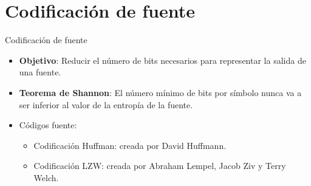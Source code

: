 \documentclass[10pt,compress]{beamer} %
\begin{document}


\section{Codificación de fuente}
\begin{frame}{Codificación de fuente}
  \begin{itemize}
  \item {\bf Objetivo}: Reducir el número de bits necesarios para representar la salida de una fuente. 
  \item {\bf Teorema de Shannon}: El número mínimo de bits por símbolo nunca va a ser inferior al valor de la entropía de la fuente.
  \item Códigos fuente:
  \begin{itemize}
    \item Codificación Huffman: creada por David Huffmann.
    \item Codificación LZW: creada por Abraham Lempel, Jacob Ziv y Terry Welch. 
  \end{itemize}
\end{itemize}
\end{frame}
\end{document}

